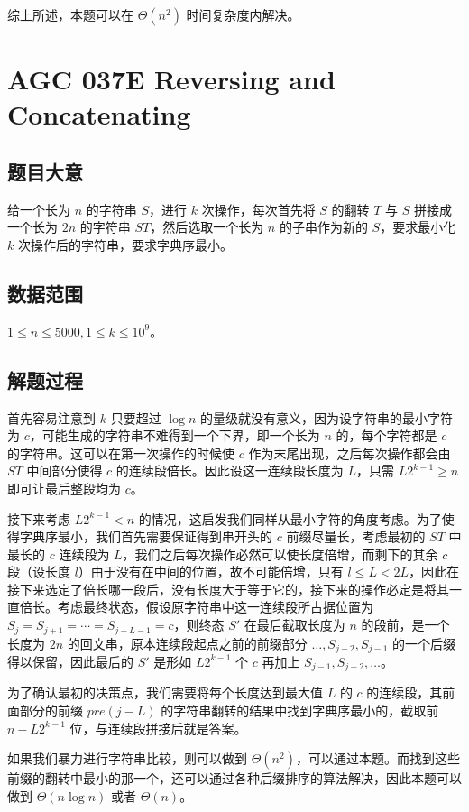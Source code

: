 \documentclass[12pt]{ctexart}
\begin{document}
综上所述，本题可以在 $\Theta(n^2)$ 时间复杂度内解决。

\newpage

\section{AGC 037E Reversing and Concatenating}

\subsection{题目大意}

给一个长为 $n$ 的字符串 $S$，进行 $k$ 次操作，每次首先将 $S$ 的翻转 $T$ 与 $S$ 拼接成一个长为 $2n$ 的字符串 $ST$，然后选取一个长为 $n$ 的子串作为新的 $S$，要求最小化 $k$ 次操作后的字符串，要求字典序最小。

\subsection{数据范围}

$1\le n\le 5000, 1\le k\le 10^9$。

\subsection{解题过程}

首先容易注意到 $k$ 只要超过 $\log n$ 的量级就没有意义，因为设字符串的最小字符为 $c$，可能生成的字符串不难得到一个下界，即一个长为 $n$ 的，每个字符都是 $c$ 的字符串。这可以在第一次操作的时候使 $c$ 作为末尾出现，之后每次操作都会由 $ST$ 中间部分使得 $c$ 的连续段倍长。因此设这一连续段长度为 $L$，只需 $L2^{k-1} \ge n$ 即可让最后整段均为 $c$。

接下来考虑 $L2^{k-1} < n$ 的情况，这启发我们同样从最小字符的角度考虑。为了使得字典序最小，我们首先需要保证得到串开头的 $c$ 前缀尽量长，考虑最初的 $ST$ 中最长的 $c$ 连续段为 $L$，我们之后每次操作必然可以使长度倍增，而剩下的其余 $c$ 段（设长度 $l$）由于没有在中间的位置，故不可能倍增，只有 $l \le L < 2L$，因此在接下来选定了倍长哪一段后，没有长度大于等于它的，接下来的操作必定是将其一直倍长。考虑最终状态，假设原字符串中这一连续段所占据位置为 $S_j = S_{j + 1} = \cdots = S_{j + L - 1} = c$，则终态 $S'$ 在最后截取长度为 $n$ 的段前，是一个长度为 $2n$ 的回文串，原本连续段起点之前的前缀部分 $\dots, S_{j-2}, S_{j-1}$ 的一个后缀得以保留，因此最后的 $S'$ 是形如 $L 2^{k-1}$ 个 $c$ 再加上 $S_{j-1}, S_{j - 2}, \dots$。

为了确认最初的决策点，我们需要将每个长度达到最大值 $L$ 的 $c$ 的连续段，其前面部分的前缀 $pre(j - L)$ 的字符串翻转的结果中找到字典序最小的，截取前 $n - L2^{k-1}$ 位，与连续段拼接后就是答案。

如果我们暴力进行字符串比较，则可以做到 $\Theta(n^2)$，可以通过本题。而找到这些前缀的翻转中最小的那一个，还可以通过各种后缀排序的算法解决，因此本题可以做到 $\Theta(n\log n)$ 或者 $\Theta(n)$。
\end{document}
